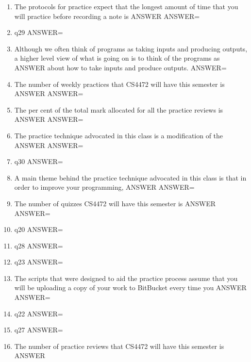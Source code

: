 \documentclass{exam}
\begin{document}
\begin{enumerate}
\item The protocols for practice expect that the longest amount of time that you will practice before recording a note is ANSWER\newline
ANSWER=
\item q29\newline
ANSWER=
\item Although we often think of programs as taking inputs and producing outputs, a higher level view of what is going on is to think of the programs as ANSWER about how to take inputs and produce outputs.\newline
ANSWER=
\item The number of weekly practices that CS4472 will have this semester is ANSWER\newline
ANSWER=
\item The per cent of the total mark allocated for all the practice reviews is ANSWER\newline
ANSWER=
\item The practice technique advocated in this class is a modification of the ANSWER\newline
ANSWER=
\item q30\newline
ANSWER=
\item A main theme behind the practice technique advocated in this class is that in order to improve your programming, ANSWER\newline
ANSWER=
\item The number of quizzes CS4472 will have this semester is ANSWER\newline
ANSWER=
\item q20\newline
ANSWER=
\item q28\newline
ANSWER=
\item q23\newline
ANSWER=
\item The scripts that were designed to aid the practice process assume that you will be uploading a copy of your work to BitBucket every time you ANSWER\newline
ANSWER=
\item q22\newline
ANSWER=
\item q27\newline
ANSWER=
\item The number of practice reviews that CS4472 will have this semester is ANSWER\newline

\end{enumerate}
\end{document}
